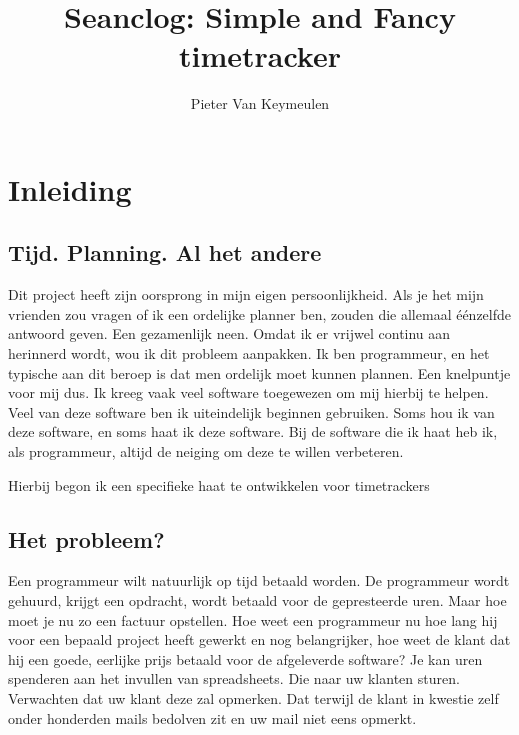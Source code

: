 \documentclass[a4paper,11pt]{article}
\begin{document}
\title{Seanclog: Simple and Fancy timetracker}
\author{Pieter Van Keymeulen}
\maketitle
\section{Inleiding}

\subsection{Tijd. Planning. Al het andere}
Dit project heeft zijn oorsprong in mijn eigen persoonlijkheid. Als je het mijn
vrienden zou vragen of ik een ordelijke planner ben, zouden die allemaal
éénzelfde antwoord geven. Een gezamenlijk neen. Omdat ik er vrijwel continu aan
herinnerd wordt, wou ik dit probleem aanpakken. Ik ben programmeur, en het
typische aan dit beroep is dat men ordelijk moet kunnen plannen. Een knelpuntje
voor mij dus. Ik kreeg vaak veel software toegewezen om mij hierbij te helpen.
Veel van deze software ben ik uiteindelijk beginnen gebruiken. Soms hou ik van
deze software, en soms haat ik deze software. Bij de software die ik haat heb
ik, als programmeur, altijd de neiging om deze te willen verbeteren.

Hierbij begon ik een specifieke haat te ontwikkelen voor timetrackers

\subsection{Het probleem?}
Een programmeur wilt natuurlijk op tijd betaald worden. De programmeur wordt
gehuurd, krijgt een opdracht, wordt betaald voor de gepresteerde uren. Maar hoe
moet je nu zo een factuur opstellen. Hoe weet een programmeur nu hoe lang hij
voor een bepaald project heeft gewerkt en nog belangrijker, hoe weet de klant
dat hij een goede, eerlijke prijs betaald voor de afgeleverde software? Je kan
uren spenderen aan het invullen van spreadsheets. Die naar uw klanten sturen.
Verwachten dat uw klant deze zal opmerken. Dat terwijl de klant in kwestie zelf
onder honderden mails bedolven zit en uw mail niet eens opmerkt.
\end{document}
